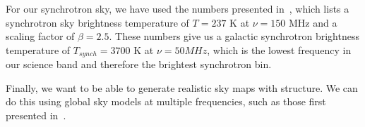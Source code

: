 For our synchrotron sky, we have used the numbers presented 
in~\cite{rogers2008}, which lists a synchrotron sky brightness temperature of 
$T = 237$ K at $\nu = 150$ MHz and a scaling factor of $\beta = 2.5$. These 
numbers give us a galactic synchrotron brightness temperature of $T_{synch} = 
3700$ K at $\nu = 50 MHz$, which is the lowest frequency in our science band 
and therefore the brightest synchrotron bin. 

Finally, we want to be able to generate realistic sky maps with structure. We 
can do this using global sky models at multiple frequencies, such as those 
first presented in~\cite{haslam1982}.
